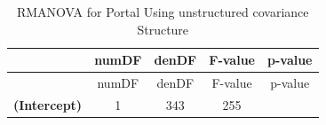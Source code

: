 \documentclass[]{article}
\begin{document}
\begin{longtable}[c]{@{}ccccc@{}}
\caption{RMANOVA for Portal Using unstructured covariance
Structure}\tabularnewline
\toprule
\begin{minipage}[b]{0.25\columnwidth}\centering\strut
~
\strut\end{minipage} &
\begin{minipage}[b]{0.10\columnwidth}\centering\strut
numDF
\strut\end{minipage} &
\begin{minipage}[b]{0.10\columnwidth}\centering\strut
denDF
\strut\end{minipage} &
\begin{minipage}[b]{0.12\columnwidth}\centering\strut
F-value
\strut\end{minipage} &
\begin{minipage}[b]{0.12\columnwidth}\centering\strut
p-value
\strut\end{minipage}\tabularnewline
\midrule
\endfirsthead
\toprule
\begin{minipage}[b]{0.25\columnwidth}\centering\strut
~
\strut\end{minipage} &
\begin{minipage}[b]{0.10\columnwidth}\centering\strut
numDF
\strut\end{minipage} &
\begin{minipage}[b]{0.10\columnwidth}\centering\strut
denDF
\strut\end{minipage} &
\begin{minipage}[b]{0.12\columnwidth}\centering\strut
F-value
\strut\end{minipage} &
\begin{minipage}[b]{0.12\columnwidth}\centering\strut
p-value
\strut\end{minipage}\tabularnewline
\midrule
\endhead
\begin{minipage}[t]{0.25\columnwidth}\centering\strut
\textbf{(Intercept)}
\strut\end{minipage} &
\begin{minipage}[t]{0.10\columnwidth}\centering\strut
1
\strut\end{minipage} &
\begin{minipage}[t]{0.10\columnwidth}\centering\strut
343
\strut\end{minipage} &
\begin{minipage}[t]{0.12\columnwidth}\centering\strut
255
\strut\end{minipage} &
\begin{minipage}[t]{0.12\columnwidth}\centering\strut

\end{minipage}
\end{longtable}
\end{document}
